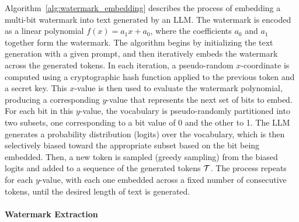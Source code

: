 \documentclass[a4paper,11pt]{llncs}
\begin{document}
Algorithm~\ref{alg:watermark_embedding} describes the process of embedding a multi-bit watermark into text generated by an LLM. The watermark is encoded as a linear polynomial $f(x)=a_1x+a_0$, where the coefficients $a_0$ and $a_1$ together form the watermark. The algorithm begins by initializing the text generation with a given prompt, and then iteratively embeds the watermark across the generated tokens. In each iteration, a pseudo-random $x$-coordinate is computed using a cryptographic hash function applied to the previous token and a secret key. This $x$-value is then used to evaluate the watermark polynomial, producing a corresponding $y$-value that represents the next set of bits to embed. For each bit in this $y$-value, the vocabulary is pseudo-randomly partitioned into two subsets, one corresponding to a bit value of 0 and the other to 1. The LLM generates a probability distribution (logits) over the vocabulary, which is then selectively biased toward the appropriate subset based on the bit being embedded. Then, a new token is sampled (greedy sampling) from the biased logits and added to a sequence of the generated tokens \( \cal T \). The process repeats for each $y$-value, with each one embedded across a fixed number of consecutive tokens, until the desired length of text is generated.

\paragraph{Watermark Extraction}
\end{document}
